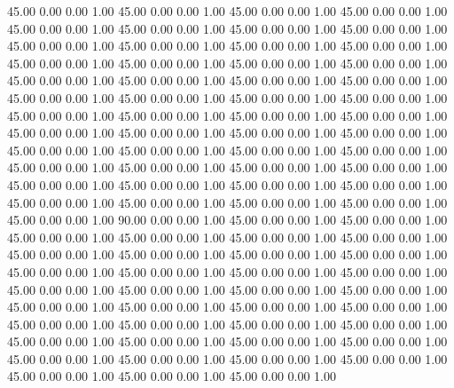    45.00   0.00   0.00   1.00
   45.00   0.00   0.00   1.00
   45.00   0.00   0.00   1.00
   45.00   0.00   0.00   1.00
   45.00   0.00   0.00   1.00
   45.00   0.00   0.00   1.00
   45.00   0.00   0.00   1.00
   45.00   0.00   0.00   1.00
   45.00   0.00   0.00   1.00
   45.00   0.00   0.00   1.00
   45.00   0.00   0.00   1.00
   45.00   0.00   0.00   1.00
   45.00   0.00   0.00   1.00
   45.00   0.00   0.00   1.00
   45.00   0.00   0.00   1.00
   45.00   0.00   0.00   1.00
   45.00   0.00   0.00   1.00
   45.00   0.00   0.00   1.00
   45.00   0.00   0.00   1.00
   45.00   0.00   0.00   1.00
   45.00   0.00   0.00   1.00
   45.00   0.00   0.00   1.00
   45.00   0.00   0.00   1.00
   45.00   0.00   0.00   1.00
   45.00   0.00   0.00   1.00
   45.00   0.00   0.00   1.00
   45.00   0.00   0.00   1.00
   45.00   0.00   0.00   1.00
   45.00   0.00   0.00   1.00
   45.00   0.00   0.00   1.00
   45.00   0.00   0.00   1.00
   45.00   0.00   0.00   1.00
   45.00   0.00   0.00   1.00
   45.00   0.00   0.00   1.00
   45.00   0.00   0.00   1.00
   45.00   0.00   0.00   1.00
   45.00   0.00   0.00   1.00
   45.00   0.00   0.00   1.00
   45.00   0.00   0.00   1.00
   45.00   0.00   0.00   1.00
   45.00   0.00   0.00   1.00
   45.00   0.00   0.00   1.00
   45.00   0.00   0.00   1.00
   45.00   0.00   0.00   1.00
   45.00   0.00   0.00   1.00
   45.00   0.00   0.00   1.00
   45.00   0.00   0.00   1.00
   45.00   0.00   0.00   1.00
   45.00   0.00   0.00   1.00
   90.00   0.00   0.00   1.00
   45.00   0.00   0.00   1.00
   45.00   0.00   0.00   1.00
   45.00   0.00   0.00   1.00
   45.00   0.00   0.00   1.00
   45.00   0.00   0.00   1.00
   45.00   0.00   0.00   1.00
   45.00   0.00   0.00   1.00
   45.00   0.00   0.00   1.00
   45.00   0.00   0.00   1.00
   45.00   0.00   0.00   1.00
   45.00   0.00   0.00   1.00
   45.00   0.00   0.00   1.00
   45.00   0.00   0.00   1.00
   45.00   0.00   0.00   1.00
   45.00   0.00   0.00   1.00
   45.00   0.00   0.00   1.00
   45.00   0.00   0.00   1.00
   45.00   0.00   0.00   1.00
   45.00   0.00   0.00   1.00
   45.00   0.00   0.00   1.00
   45.00   0.00   0.00   1.00
   45.00   0.00   0.00   1.00
   45.00   0.00   0.00   1.00
   45.00   0.00   0.00   1.00
   45.00   0.00   0.00   1.00
   45.00   0.00   0.00   1.00
   45.00   0.00   0.00   1.00
   45.00   0.00   0.00   1.00
   45.00   0.00   0.00   1.00
   45.00   0.00   0.00   1.00
   45.00   0.00   0.00   1.00
   45.00   0.00   0.00   1.00
   45.00   0.00   0.00   1.00
   45.00   0.00   0.00   1.00
   45.00   0.00   0.00   1.00
   45.00   0.00   0.00   1.00
   45.00   0.00   0.00   1.00
